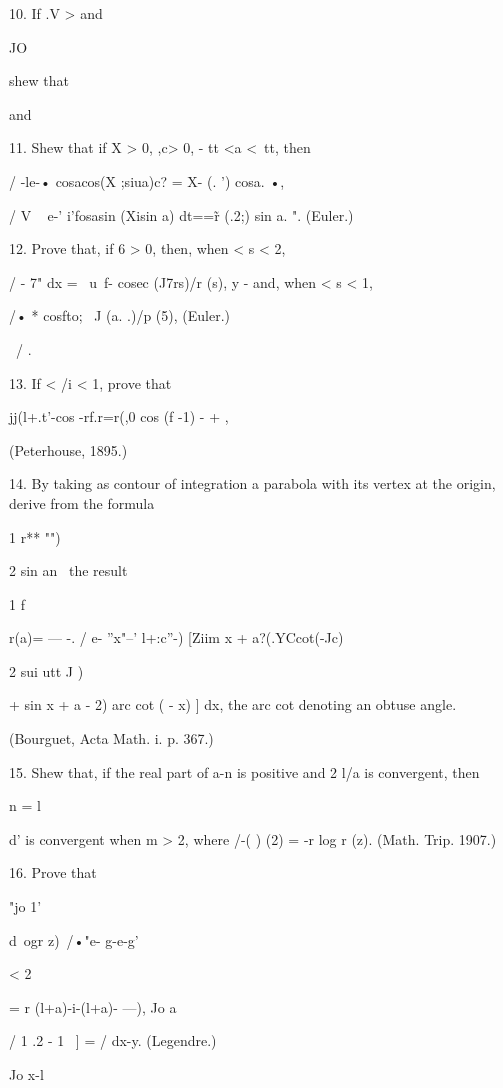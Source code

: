 10. If .V > and 

JO 

shew that 

and 

11. Shew that if X > 0, ,c> 0, -  tt <a <\ tt, then 

/   -le-• cosacos(X ;siua)c?  = X- (. ') cosa. •, 

/ V ~  e-' i'fosasin (Xisin a) dt==\~  r (.2;) sin a. ". (Euler.) 

12. Prove that, if 6 > 0, then, when < s < 2, 

/ - 7" dx = \ u\ f-  cosec (J7rs)/r (s), 
y -  
and, when < s < 1, 

/• * cosfto;       \  J    (a. .)/p (5), (Euler.) 

\ / .  

13. If < /i < 1, prove that 

jj(l+.t'-cos -rf.r=r(,0  cos (f -1) -  + ,  

(Peterhouse, 1895.) 

14. By taking as contour of integration a parabola with its vertex at the origin, derive 
from the formula 

1 r** "") 



2  sin an \  
the result 

1 f  

r(a)= — -. / e- ''x"--'  l+:c''-) [Ziim x + a?(.YCcot(-Jc)  

2 sui utt J  ) 

+ sin  x +  a - 2) arc cot ( - x) ] dx, 
the arc cot denoting an obtuse angle. 

(Bourguet, Acta Math. i. p. 367.) 

15. Shew that, if the real part of a-n is positive and 2 l/a   is convergent, then 

n = l 

d' 
is convergent when m > 2, where \//-( ) (2) = -r  log r (z). (Math. Trip. 1907.) 

16. Prove that 

"jo 1' 



d\ ogr z)\  /•"e- g-e-g'  

< 2 



= r (l+a)-i-(l+a)- ---), 
Jo a 

/  1  .2 - 1 \  ] 
= /     dx-y. (Legendre.) 

Jo x-l 



